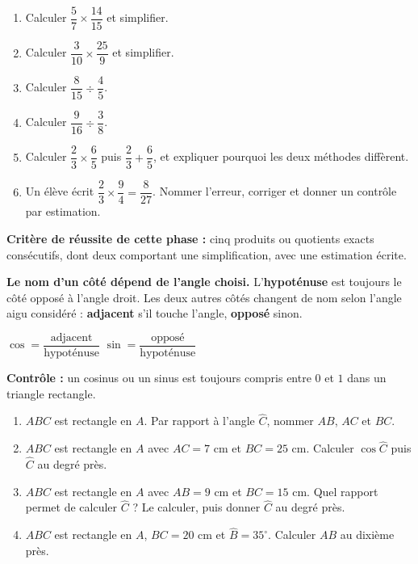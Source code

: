 \documentclass[10pt,a4paper]{article}
\begin{document}
\begin{enumerate}
\needspace{18mm}
\item Calculer $\dfrac{5}{7}\times\dfrac{14}{15}$ et simplifier.
\needspace{18mm}
\item Calculer $\dfrac{3}{10}\times\dfrac{25}{9}$ et simplifier.
\needspace{18mm}
\item Calculer $\dfrac{8}{15}\div\dfrac{4}{5}$.
\needspace{18mm}
\item Calculer $\dfrac{9}{16}\div\dfrac{3}{8}$.
\needspace{18mm}
\item Calculer $\dfrac{2}{3}\times\dfrac{6}{5}$ puis $\dfrac{2}{3}+\dfrac{6}{5}$, et expliquer pourquoi les deux méthodes diffèrent.
\needspace{18mm}
\item Un élève écrit $\dfrac{2}{3}\times\dfrac{9}{4}=\dfrac{8}{27}$. Nommer l'erreur, corriger et donner un contrôle par estimation.
\end{enumerate}
\begin{successbox}\textbf{Critère de réussite de cette phase :} cinq produits ou quotients exacts consécutifs, dont deux comportant une simplification, avec une estimation écrite.\end{successbox}
\certline
\needspace{62mm}\par\vspace{3mm}
\begin{methodbox}
\textbf{Le nom d'un côté dépend de l'angle choisi.} L'\textbf{hypoténuse} est toujours le côté opposé à
l'angle droit. Les deux autres côtés changent de nom selon l'angle aigu considéré : \textbf{adjacent}
s'il touche l'angle, \textbf{opposé} sinon.
\par\smallskip
$\cos = \dfrac{\text{adjacent}}{\text{hypoténuse}}$ \qquad $\sin = \dfrac{\text{opposé}}{\text{hypoténuse}}$
\par\smallskip
\textbf{Contrôle :} un cosinus ou un sinus est toujours compris entre $0$ et $1$ dans un triangle rectangle.
\end{methodbox}
\begin{enumerate}
\needspace{18mm}
\item $ABC$ est rectangle en $A$. Par rapport à l'angle $\widehat{C}$, nommer $AB$, $AC$ et $BC$.
\needspace{18mm}
\item $ABC$ est rectangle en $A$ avec $AC = 7$ cm et $BC = 25$ cm. Calculer $\cos\widehat{C}$ puis $\widehat{C}$ au degré près.
\needspace{18mm}
\item $ABC$ est rectangle en $A$ avec $AB = 9$ cm et $BC = 15$ cm. Quel rapport permet de calculer $\widehat{C}$ ? Le calculer, puis donner $\widehat{C}$ au degré près.
\needspace{18mm}
\item $ABC$ est rectangle en $A$, $BC = 20$ cm et $\widehat{B} = 35^\circ$. Calculer $AB$ au dixième près.
\end{enumerate}
\end{document}
